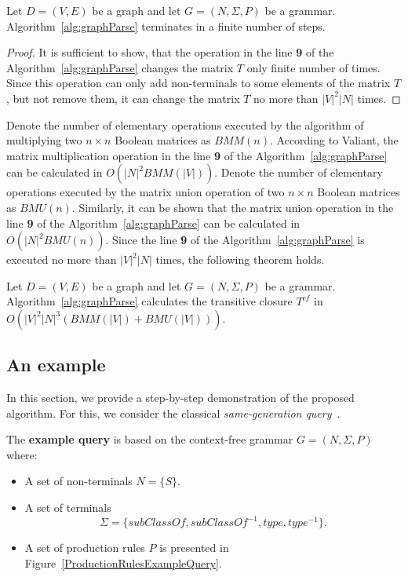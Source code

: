 \documentclass[runningheads,a4paper]{llncs}
\begin{document}
\begin{mytheorem}\label{thm:finite}
	Let $D = (V,E)$ be a graph and let $G =(N,\Sigma,P)$ be a grammar. Algorithm~\ref{alg:graphParse} terminates in a finite number of steps. 
\end{mytheorem}
\begin{proof}
	It is sufficient to show, that the operation in the line \textbf{9} of the Algorithm~\ref{alg:graphParse} changes the matrix $T$ only finite number of times. Since this operation can only add non-terminals to some elements of the matrix $T$, but not remove them, it can change the matrix $T$ no more than $|V|^2|N|$ times.
\end{proof}

Denote the number of elementary operations executed by the algorithm of multiplying two $n \times n$ Boolean matrices as $BMM(n)$. According to Valiant, the matrix multiplication operation in the line \textbf{9} of the Algorithm~\ref{alg:graphParse} can be calculated in $O(|N|^2 BMM(|V|))$. Denote the number of elementary operations executed by the matrix union operation of two $n \times n$ Boolean matrices as $BMU(n)$. Similarly, it can be shown that the matrix union operation in the line \textbf{9} of the Algorithm~\ref{alg:graphParse} can be calculated in $O(|N|^2 BMU(n))$. Since the line \textbf{9} of the Algorithm~\ref{alg:graphParse} is executed no more than $|V|^2|N|$ times, the following theorem holds.

\begin{mytheorem}\label{thm:time}
	Let $D = (V,E)$ be a graph and let $G =(N,\Sigma,P)$ be a grammar. Algorithm~\ref{alg:graphParse} calculates the transitive closure $T^{cf}$ in $O(|V|^2|N|^3(BMM(|V|) + BMU(|V|)))$.
\end{mytheorem}



\subsection{An example} \label{section_example}
In this section, we provide a step-by-step demonstration of the proposed algorithm. For this, we consider the classical \textit{same-generation query}~\cite{FndDB}.

The \textbf{example query} is based on the context-free grammar $G = (N, \Sigma, P)$ where:
\begin{itemize}
	\item A set of non-terminals $N = \{S\}$.
	\item A set of terminals $$\Sigma = \{subClassOf, subClassOf^{-1}, type, type^{-1}\}.$$
	\item A set of production rules $P$ is presented in Figure~\ref{ProductionRulesExampleQuery}.
\end{itemize}
\end{document}
